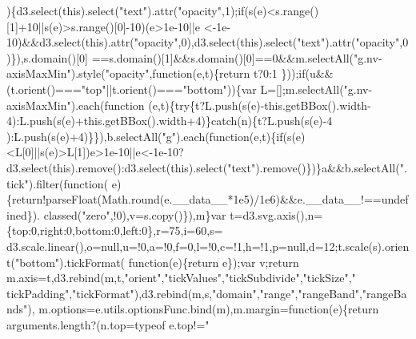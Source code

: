 \begin{DoxyCode}
      )\{d3.select(\textcolor{keyword}{this}).select(\textcolor{stringliteral}{"text"}).attr(\textcolor{stringliteral}{"opacity"},1);\textcolor{keywordflow}{if}(s(e)<s.range()[1]+10||s(e)>s.range()[0]-10)(e>1e-10||e
      <-1e-10)&&d3.select(\textcolor{keyword}{this}).attr(\textcolor{stringliteral}{"opacity"},0),d3.select(\textcolor{keyword}{this}).select(\textcolor{stringliteral}{"text"}).attr(\textcolor{stringliteral}{"opacity"},0)\}),s.domain()[0]
      ==s.domain()[1]&&s.domain()[0]==0&&m.selectAll(\textcolor{stringliteral}{"g.nv-axisMaxMin"}).style(\textcolor{stringliteral}{"opacity"},\textcolor{keyword}{function}(e,t)\{\textcolor{keywordflow}{return} t?0:1
      \}));\textcolor{keywordflow}{if}(u&&(t.orient()===\textcolor{stringliteral}{"top"}||t.orient()===\textcolor{stringliteral}{"bottom"}))\{var L=[];m.selectAll(\textcolor{stringliteral}{"g.nv-axisMaxMin"}).each(\textcolor{keyword}{function}
      (e,t)\{\textcolor{keywordflow}{try}\{t?L.push(s(e)-this.getBBox().width-4):L.push(s(e)+this.getBBox().width+4)\}\textcolor{keywordflow}{catch}(n)\{t?L.push(s(e)-4
      ):L.push(s(e)+4)\}\}),b.selectAll(\textcolor{stringliteral}{"g"}).each(\textcolor{keyword}{function}(e,t)\{\textcolor{keywordflow}{if}(s(e)<L[0]||s(e)>L[1])e>1e-10||e<-1e-10?
      d3.select(\textcolor{keyword}{this}).remove():d3.select(\textcolor{keyword}{this}).select(\textcolor{stringliteral}{"text"}).remove()\})\}a&&b.selectAll(\textcolor{stringliteral}{".tick"}).filter(\textcolor{keyword}{function}(
      e)\{\textcolor{keywordflow}{return}!parseFloat(Math.round(e.\_\_data\_\_*1e5)/1e6)&&e.\_\_data\_\_!==undefined\}).
      classed(\textcolor{stringliteral}{"zero"},!0),v=s.copy()\}),m\}var t=d3.svg.axis(),n=\{top:0,right:0,bottom:0,left:0\},r=75,i=60,s=
      d3.scale.linear(),o=null,u=!0,a=!0,f=0,l=!0,c=!1,h=!1,p=null,d=12;t.scale(s).orient(\textcolor{stringliteral}{"bottom"}).tickFormat(\textcolor{keyword}{
      function}(e)\{\textcolor{keywordflow}{return} e\});var v;\textcolor{keywordflow}{return} m.axis=t,d3.rebind(m,t,\textcolor{stringliteral}{"orient"},\textcolor{stringliteral}{"tickValues"},\textcolor{stringliteral}{"tickSubdivide"},\textcolor{stringliteral}{"tickSize"},\textcolor{stringliteral}{"
      tickPadding"},\textcolor{stringliteral}{"tickFormat"}),d3.rebind(m,s,\textcolor{stringliteral}{"domain"},\textcolor{stringliteral}{"range"},\textcolor{stringliteral}{"rangeBand"},\textcolor{stringliteral}{"rangeBands"}),
      m.options=e.utils.optionsFunc.bind(m),m.margin=\textcolor{keyword}{function}(e)\{\textcolor{keywordflow}{return} arguments.length?(n.top=typeof e.top!=\textcolor{stringliteral}{"
}
\end{DoxyCode}

